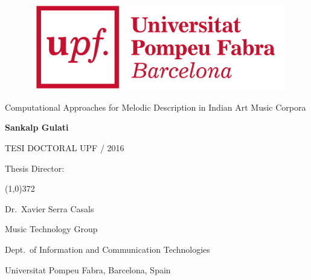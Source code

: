 
\newpage
\thispagestyle{empty}
\begin{titlingpage}
\begin{flushright}

  \begin{figure}[t]
    \begin{flushright}
	\includegraphics[scale=0.08]{ch00/figures/logo_upf_color.png}
    \end{flushright}
  \end{figure}

  \vspace*{2cm} 

  {\huge {Computational Approaches for Melodic Description in Indian Art Music Corpora}}
  
  \vspace*{2.5cm}

  \textbf{\large {Sankalp Gulati}}
  
  \vspace*{\fill} 
  TESI DOCTORAL UPF / 2016

\end{flushright}
  
  \vspace*{2cm}

  Thesis Director:

  \vspace*{-0.25cm}

  \line(1,0){372}
  
  \vspace*{0.25cm}

  Dr.~Xavier Serra Casals
	
  Music Technology Group
  
  Dept.~of Information and Communication Technologies

  Universitat Pompeu Fabra, Barcelona, Spain
  
\end{titlingpage}


